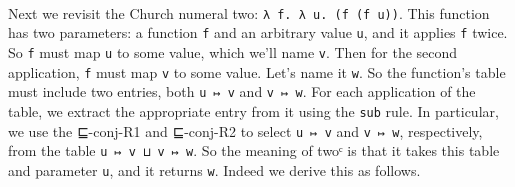 \begin{fence}
\begin{code}%
\>[0]\AgdaSpace{}%
\AgdaSymbol{:}\AgdaSpace{}%
\AgdaSpace{}%
\AgdaSymbol{\{}\AgdaSpace{}%
\AgdaSymbol{:}\AgdaSpace{}%
\AgdaSymbol{\}}\AgdaSpace{}%
\AgdaSpace{}%
\AgdaSpace{}%
\AgdaSpace{}%
\AgdaSpace{}%
\AgdaSpace{}%
\AgdaSpace{}%
\AgdaSpace{}%
\AgdaSymbol{(}\AgdaSpace{}%
\AgdaSpace{}%
\AgdaSymbol{)}\<%
\\
\>[0]\AgdaSpace{}%
\AgdaSymbol{\{}\AgdaSymbol{\}}\AgdaSpace{}%
\AgdaSymbol{=}\AgdaSpace{}%
\AgdaSpace{}%
\AgdaSymbol{(}\AgdaSpace{}%
\AgdaSymbol{)}\AgdaSpace{}%
\AgdaSymbol{(}\AgdaSpace{}%
\AgdaSymbol{)}\<%
\end{code}
\end{fence}

Next we revisit the Church numeral two:
\texttt{λ\ f.\ λ\ u.\ (f\ (f\ u))}. This function has two parameters: a
function \texttt{f} and an arbitrary value \texttt{u}, and it applies
\texttt{f} twice. So \texttt{f} must map \texttt{u} to some value, which
we'll name \texttt{v}. Then for the second application, \texttt{f} must
map \texttt{v} to some value. Let's name it \texttt{w}. So the
function's table must include two entries, both \texttt{u\ ↦\ v} and
\texttt{v\ ↦\ w}. For each application of the table, we extract the
appropriate entry from it using the \texttt{sub} rule. In particular, we
use the ⊑-conj-R1 and ⊑-conj-R2 to select \texttt{u\ ↦\ v} and
\texttt{v\ ↦\ w}, respectively, from the table
\texttt{u\ ↦\ v\ ⊔\ v\ ↦\ w}. So the meaning of twoᶜ is that it takes
this table and parameter \texttt{u}, and it returns \texttt{w}. Indeed
we derive this as follows.

